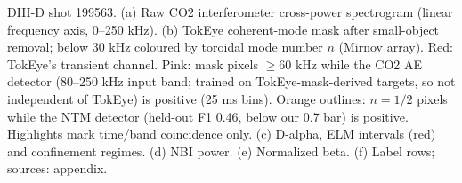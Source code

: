\caption{DIII-D shot 199563. (a) Raw CO2 interferometer cross-power spectrogram (linear frequency axis, 0--250 kHz). (b) TokEye coherent-mode mask after small-object removal; below 30 kHz coloured by toroidal mode number $n$ (Mirnov array). Red: TokEye's transient channel. Pink: mask pixels $\geq$60 kHz while the CO2 AE detector (80--250 kHz input band; trained on TokEye-mask-derived targets, so not independent of TokEye) is positive (25 ms bins). Orange outlines: $n=1/2$ pixels while the NTM detector (held-out F1 0.46, below our 0.7 bar) is positive. Highlights mark time/band coincidence only. (c) D-alpha, ELM intervals (red) and confinement regimes. (d) NBI power. (e) Normalized beta. (f) Label rows; sources: appendix.}
\label{fig:interpreter-199563}
